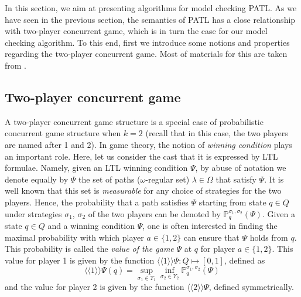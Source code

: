 \documentclass[times, 10 pt,twocolumn]{article}
\newcommand{\mb}[1]{\mathbb{#1}}
\newcommand{\lla}{\langle\langle}
\newcommand{\rra}{\rangle\rangle}
\begin{document}
In this section, we aim at presenting algorithms for model
checking PATL. As we have seen in the previous section, the
semantics of PATL has a close relationship with two-player
concurrent game, which is %
in turn the case for our model checking algorithm. To this end,
first we introduce some notions and properties regarding the
two-player concurrent game. Most of materials for this are taken
from \cite{deAM04}.

\subsection{Two-player concurrent game}

A two-player concurrent game structure is a special case of
probabilistic concurrent game structure when $k=2$ (recall that in
this case, the two players are named after 1 and 2). In game
theory, the notion of \emph{winning condition} plays an important
role. Here, let us consider the cast that it is expressed by LTL
formulae. Namely, given an LTL winning condition $\Psi$, by abuse
of notation we denote equally by $\Psi$ the set of paths
($\omega$-regular set) $\lambda\in \Omega$ that satisfy $\Psi$. It
is well known that this set is \emph{measurable} for any choice of
strategies for the two players. Hence, the probability that a path
satisfies $\Psi$ starting from state $q\in Q$ under strategies
$\sigma_1$, $\sigma_2$ of the two players can be denoted by
$\mb{P}_q^{\sigma_1,\sigma_2}(\Psi)$. Given a state $q\in Q$ and a
winning condition $\Psi$, one is often interested in finding the
maximal probability with which player $a\in \{1,2\}$ can ensure
that $\Psi$ holds from $q$. This probability is called the
\emph{value of the game} $\Psi$ at $q$ for player $a\in \{1,2\}$.
This value for player 1 is given by the function $\lla
1\rra\Psi:Q\mapsto [0,1]$, defined as
%
%
%
\[ \lla 1\rra\Psi(q) = \sup_{\sigma_1 \in \Upsilon_1} \inf_{\sigma_{2} \in
\Upsilon_{2}} \mathbb{P}_q^{\sigma_1, \sigma_{2}}(\Psi)\] and the
value for player 2 is given by the function $\lla 2\rra\Psi$,
defined symmetrically.

\end{document}
